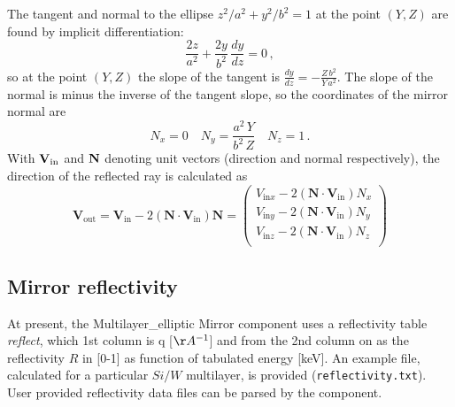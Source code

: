 The tangent and normal to the ellipse $z^2/a^2 + y^2/b^2=1$ at the
point $(Y,Z)$ are found by implicit differentiation: \begin{equation} 
\frac{2z}{a^2} + \frac{2y}{b^2} \,\frac{dy}{dz} = 0\,, \end{equation} so at the
point $(Y,Z)$ the slope of the tangent is $\frac{dy}{dz} =
-\frac{Z\,b^2}{Y\,a^2}$. The slope of the normal is minus the
inverse of the tangent slope, so the coordinates of the mirror
normal are \begin{equation} N_x = 0 \quad N_y = \frac{a^2\,Y}{b^2\,Z} \quad N_z =
1\,. \end{equation} With $\bf{V}_\textrm{in}$ and $\bf{N}$ denoting unit
vectors (direction and normal respectively), the direction of the
reflected ray is calculated as \begin{equation} \boldsymbol{{V}}_\textrm{out} =
\boldsymbol{{V}}_\textrm{in} -2(\boldsymbol{{N}}\cdot\boldsymbol{{V}}_\textrm{in})\boldsymbol{{N}} =
        \left(
      \begin{array}{c}
        V_{\textrm{in}x} - 2(\boldsymbol{{N}}\cdot\boldsymbol{{V}}_\textrm{in})N_x \\
               V_{\textrm{in}y} - 2(\boldsymbol{{N}}\cdot\boldsymbol{{V}}_\textrm{in})N_y \\
                V_{\textrm{in}z} - 2(\boldsymbol{{N}}\cdot\boldsymbol{{V}}_\textrm{in})N_z \\
      \end{array}
    \right)
\end{equation}


\subsection{Mirror reflectivity}
\label{ss:mirrorreflecttable}

At present, the Multilayer\_elliptic Mirror component uses a reflectivity table \textit{reflect}, 
which 1st column is q [$\AA^{-1}$] and from the 2nd column on as the reflectivity $R$ in [0-1]
as function of tabulated energy [\si{keV}]. 
An example file, calculated for a particular $Si/W$ multilayer, is provided (\verb+reflectivity.txt+).
User provided reflectivity data files can be parsed by the component.

